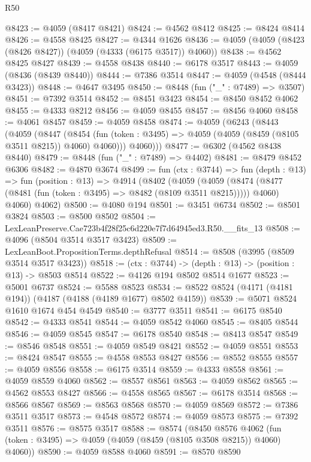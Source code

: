 \begin{lexlean}{R50}
\begin{coremodule}
@8423 := @4059 (@8417 @8421)
@8424 := @4562 @8412
@8425 := @8424 @8414
@8426 := @4558 @8425
@8427 := @4344 @1626
@8436 := @4059 (@4059 (@8423 (@8426 @8427)) (@4059 (@4333 (@6175 @3517)) @4060))
@8438 := @4562 @8425 @8427
@8439 := @4558 @8438
@8440 := @6178 @3517
@8443 := @4059 (@8436 (@8439 @8440))
@8444 := @7386 @3514
@8447 := @4059 (@4548 (@8444 @3423))
@8448 := @4647 @3495
@8450 := @8448 (fun ("_" : @7489) => @3507)
@8451 := @7392 @3514
@8452 := @8451 @3423
@8454 := @8450 @8452 @4062
@8455 := @4333 @8212
@8456 := @4059 @8455
@8457 := @8456 @4060
@8458 := @4061 @8457
@8459 := @4059 @8458
@8474 := @4059
    (@6243
      (@8443
        (@4059
          (@8447
            (@8454 (fun (token : @3495) => @4059 (@4059 (@8459 (@8105 @3511 @8215)) @4060) @4060)))
          @4060)))
@8477 := @6302 (@4562 @8438 @8440)
@8479 := @8448 (fun ("_" : @7489) => @4402)
@8481 := @8479 @8452 @6306
@8482 := @4870 @3674
@8499 := fun (ctx : @3744) =>
  fun (depth : @13) =>
  fun (position : @13) =>
  @4914
    (@8402
      (@4059
        (@4059 (@8474 (@8477 (@8481 (fun (token : @3495) => @8482 (@8109 @3511 @8215))))) @4060)
        @4060)
      @4062)
@8500 := @4080 @194
@8501 := @3451 @6734
@8502 := @8501 @3824
@8503 := @8500 @8502
@8504 := LexLeanPreserve.Cae723b4f28f25c6d220e7f7d64945ed3.R50.__fits_13
@8508 := @4096 (@8504 @3514 @3517 @3423)
@8509 := LexLeanBoot.PropositionTerms.depthRefusal
@8514 := @8508 (@3995 (@8509 @3514 @3517 @3423))
@8518 := (ctx : @3744) -> (depth : @13) -> (position : @13) -> @8503 @8514
@8522 := @4126 @194 @8502 @8514 @1677
@8523 := @5001 @6737
@8524 := @5588 @8523
@8534 := @8522 @8524 (@4171 (@4181 @194)) (@4187 (@4188 (@4189 @1677) @8502 @4159))
@8539 := @5071 @8524 @1610 @1674 @454 @4549
@8540 := @3777 @3511
@8541 := @6175 @8540
@8542 := @4333 @8541
@8544 := @4059 @8542 @4060
@8545 := @8405 @8544
@8546 := @4059 @8545
@8547 := @6178 @8540
@8548 := @8413 @8547
@8549 := @8546 @8548
@8551 := @4059 @8549 @8421
@8552 := @4059 @8551
@8553 := @8424 @8547
@8555 := @4558 @8553 @8427
@8556 := @8552 @8555
@8557 := @4059 @8556
@8558 := @6175 @3514
@8559 := @4333 @8558
@8561 := @4059 @8559 @4060
@8562 := @8557 @8561
@8563 := @4059 @8562
@8565 := @4562 @8553 @8427
@8566 := @4558 @8565
@8567 := @6178 @3514
@8568 := @8566 @8567
@8569 := @8563 @8568
@8570 := @4059 @8569
@8572 := @7386 @3511 @3517
@8573 := @4548 @8572
@8574 := @4059 @8573
@8575 := @7392 @3511
@8576 := @8575 @3517
@8588 := @8574
    (@8450
      @8576
      @4062
      (fun (token : @3495) => @4059 (@4059 (@8459 (@8105 @3508 @8215)) @4060) @4060))
@8590 := @4059 @8588 @4060
@8591 := @8570 @8590

\end{coremodule}
\end{lexlean}
